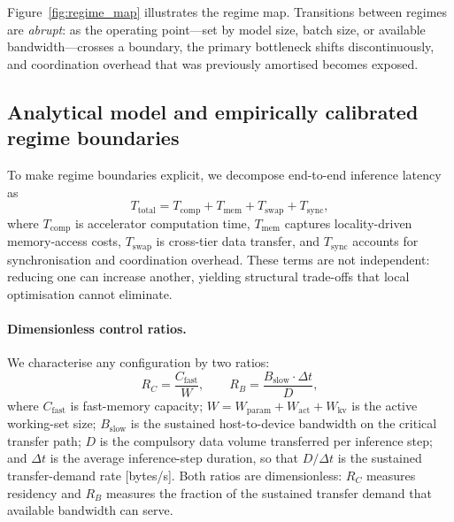 Figure~\ref{fig:regime_map} illustrates the regime map.
Transitions between regimes are \emph{abrupt}: as the operating point---set by
model size, batch size, or available bandwidth---crosses a boundary, the
primary bottleneck shifts discontinuously, and coordination overhead that was
previously amortised becomes exposed.


\subsection{Analytical model and empirically calibrated regime boundaries}
\label{sec:model}

To make regime boundaries explicit, we decompose end-to-end inference latency as
\begin{equation}
T_{\mathrm{total}} = T_{\mathrm{comp}} + T_{\mathrm{mem}} + T_{\mathrm{swap}} + T_{\mathrm{sync}},
\label{eq:latency_decomp}
\end{equation}
where $T_{\mathrm{comp}}$ is accelerator computation time, $T_{\mathrm{mem}}$
captures locality-driven memory-access costs, $T_{\mathrm{swap}}$ is cross-tier
data transfer, and $T_{\mathrm{sync}}$ accounts for synchronisation and
coordination overhead.
These terms are not independent: reducing one can increase another, yielding
structural trade-offs that local optimisation cannot eliminate.

\paragraph{Dimensionless control ratios.}
We characterise any configuration by two ratios:
\begin{equation}
R_C = \frac{C_{\mathrm{fast}}}{W}, \qquad
R_B = \frac{B_{\mathrm{slow}} \cdot \Delta t}{D},
\label{eq:ratios}
\end{equation}
where $C_{\mathrm{fast}}$ is fast-memory capacity;
$W = W_{\mathrm{param}} + W_{\mathrm{act}} + W_{\mathrm{kv}}$ is the active
working-set size; $B_{\mathrm{slow}}$ is the sustained host-to-device bandwidth
on the critical transfer path; $D$ is the compulsory data volume transferred
per inference step; and $\Delta t$ is the average inference-step duration,
so that $D/\Delta t$ is the sustained transfer-demand rate [bytes/s].
Both ratios are dimensionless: $R_C$ measures residency and $R_B$ measures the
fraction of the sustained transfer demand that available bandwidth can serve.

